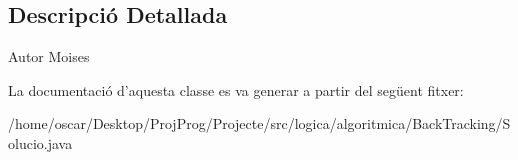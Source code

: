 \subsection{Descripció Detallada}
\begin{DoxyAuthor}{Autor}
Moises 
\end{DoxyAuthor}


La documentació d'aquesta classe es va generar a partir del següent fitxer\+:\begin{DoxyCompactItemize}
\item 
/home/oscar/\+Desktop/\+Proj\+Prog/\+Projecte/src/logica/algoritmica/\+Back\+Tracking/Solucio.\+java\end{DoxyCompactItemize}
